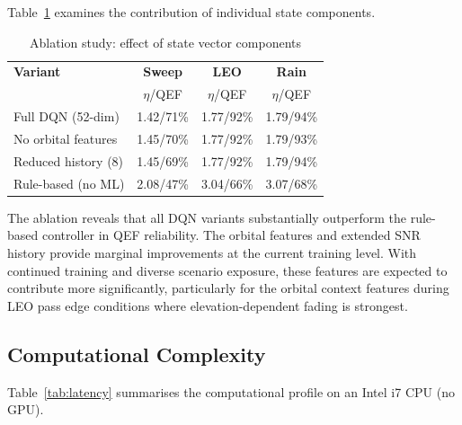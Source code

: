 \documentclass[conference]{IEEEtran}
\begin{document}
Table~\ref{tab:ablation} examines the contribution of individual state components.

\begin{table}[t]
\centering
\caption{Ablation study: effect of state vector components}
\label{tab:ablation}
\renewcommand{\arraystretch}{1.15}
\small
\begin{tabular}{lccc}
\toprule
\textbf{Variant} & \textbf{Sweep} & \textbf{LEO} & \textbf{Rain} \\
 & $\eta$/QEF & $\eta$/QEF & $\eta$/QEF \\
\midrule
Full DQN (52-dim)     & 1.42/71\% & 1.77/92\% & 1.79/94\% \\
No orbital features   & 1.45/70\% & 1.77/92\% & 1.79/93\% \\
Reduced history (8)   & 1.45/69\% & 1.77/92\% & 1.79/94\% \\
\midrule
Rule-based (no ML)    & 2.08/47\% & 3.04/66\% & 3.07/68\% \\
\bottomrule
\end{tabular}
\end{table}

The ablation reveals that all DQN variants substantially outperform the rule-based controller in QEF reliability. The orbital features and extended SNR history provide marginal improvements at the current training level. With continued training and diverse scenario exposure, these features are expected to contribute more significantly, particularly for the orbital context features during LEO pass edge conditions where elevation-dependent fading is strongest.

\subsection{Computational Complexity}

Table~\ref{tab:latency} summarises the computational profile on an Intel i7 CPU (no GPU).
\end{document}
